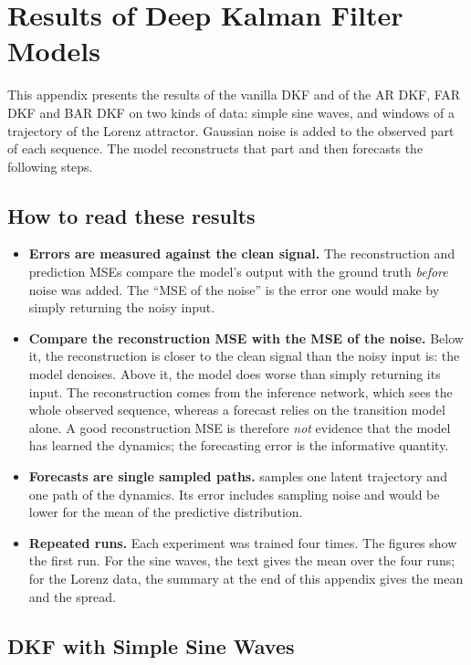 \section{Results of Deep Kalman Filter Models}\label{sec:results}

This appendix presents the results of the vanilla DKF and of the AR DKF,
FAR DKF and BAR DKF on two kinds of data: simple sine waves, and windows
of a trajectory of the Lorenz attractor. Gaussian noise is added to the
observed part of each sequence. The model reconstructs that part and then
forecasts the following steps.

\subsection*{How to read these results}

\begin{itemize}
    \item \textbf{Errors are measured against the clean signal.} The
    reconstruction and prediction MSEs compare the model's output with
    the ground truth \emph{before} noise was added. The \enquote{MSE of
    the noise} is the error one would make by simply returning the noisy
    input.
    \item \textbf{Compare the reconstruction MSE with the MSE of the
    noise.} Below it, the reconstruction is closer to the clean signal
    than the noisy input is: the model denoises. Above it, the model does
    worse than simply returning its input. The reconstruction comes from
    the inference network, which sees the whole observed sequence,
    whereas a forecast relies on the transition model alone. A good
    reconstruction MSE is therefore \emph{not} evidence that the model
    has learned the dynamics; the forecasting error is the informative
    quantity.
    \item \textbf{Forecasts are single sampled paths.} 
    samples one latent trajectory and one path of the dynamics. Its error
    includes sampling noise and would be lower for the mean of the
    predictive distribution.
    \item \textbf{Repeated runs.} Each experiment was trained four
    times. The figures show the first run. For the sine waves, the text
    gives the mean over the four runs; for the Lorenz data, the summary
    at the end of this appendix gives the mean and the spread.
\end{itemize}

\subsection*{DKF with Simple Sine Waves}

